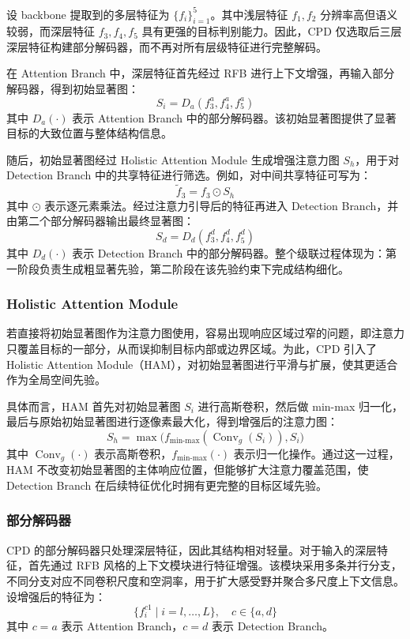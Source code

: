 \documentclass[UTF8,a4paper,10pt]{ctexart}
\begin{document}
设 backbone 提取到的多层特征为 \(\{f_i\}_{i=1}^{5}\)。其中浅层特征 \(f_1,f_2\) 分辨率高但语义较弱，而深层特征 \(f_3,f_4,f_5\) 具有更强的目标判别能力。因此，CPD 仅选取后三层深层特征构建部分解码器，而不再对所有层级特征进行完整解码。

在 Attention Branch 中，深层特征首先经过 RFB 进行上下文增强，再输入部分解码器，得到初始显著图：
\[
S_i = D_a(f_3^a, f_4^a, f_5^a)
\]
其中 \(D_a(\cdot)\) 表示 Attention Branch 中的部分解码器。该初始显著图提供了显著目标的大致位置与整体结构信息。

随后，初始显著图经过 Holistic Attention Module 生成增强注意力图 \(S_h\)，用于对 Detection Branch 中的共享特征进行筛选。例如，对中间共享特征可写为：
\[
\widetilde{f}_3 = f_3 \odot S_h
\]
其中 \(\odot\) 表示逐元素乘法。经过注意力引导后的特征再进入 Detection Branch，并由第二个部分解码器输出最终显著图：
\[
S_d = D_d(f_3^d, f_4^d, f_5^d)
\]
其中 \(D_d(\cdot)\) 表示 Detection Branch 中的部分解码器。整个级联过程体现为：第一阶段负责生成粗显著先验，第二阶段在该先验约束下完成结构细化。

\subsubsection{Holistic Attention Module}

若直接将初始显著图作为注意力图使用，容易出现响应区域过窄的问题，即注意力只覆盖目标的一部分，从而误抑制目标内部或边界区域。为此，CPD 引入了 Holistic Attention Module（HAM），对初始显著图进行平滑与扩展，使其更适合作为全局空间先验。

具体而言，HAM 首先对初始显著图 \(S_i\) 进行高斯卷积，然后做 min-max 归一化，最后与原始初始显著图进行逐像素最大化，得到增强后的注意力图：
\[
S_h =
\max
\Big(
f_{\text{min-max}}(\operatorname{Conv}_{g}(S_i)),
S_i
\Big)
\]
其中 \(\operatorname{Conv}_{g}(\cdot)\) 表示高斯卷积，\(f_{\text{min-max}}(\cdot)\) 表示归一化操作。通过这一过程，HAM 不改变初始显著图的主体响应位置，但能够扩大注意力覆盖范围，使 Detection Branch 在后续特征优化时拥有更完整的目标区域先验。

\subsubsection{部分解码器}

CPD 的部分解码器只处理深层特征，因此其结构相对轻量。对于输入的深层特征，首先通过 RFB 风格的上下文模块进行特征增强。该模块采用多条并行分支，不同分支对应不同卷积尺度和空洞率，用于扩大感受野并聚合多尺度上下文信息。设增强后的特征为：
\[
\{f_i^{c1}\mid i=l,\ldots,L\}, \quad c \in \{a,d\}
\]
其中 \(c=a\) 表示 Attention Branch，\(c=d\) 表示 Detection Branch。
\end{document}
